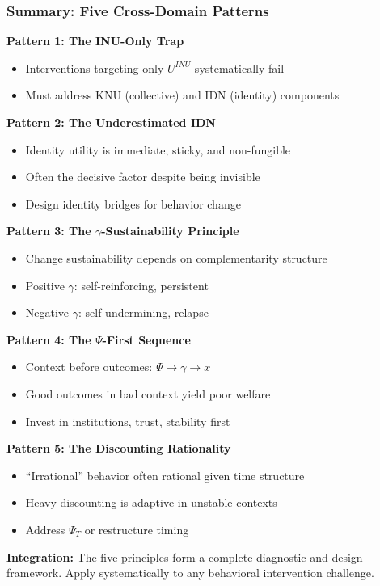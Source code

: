 \subsubsection{Summary: Five Cross-Domain Patterns}

\begin{tcolorbox}[colback=gray!5!white, colframe=gray!75!black, title=Section 10.10 Summary: Five Principles for Behavioral Intervention]

\textbf{Pattern 1: The INU-Only Trap}
\begin{itemize}
\item Interventions targeting only $U^{INU}$ systematically fail
\item Must address KNU (collective) and IDN (identity) components
\end{itemize}

\textbf{Pattern 2: The Underestimated IDN}
\begin{itemize}
\item Identity utility is immediate, sticky, and non-fungible
\item Often the decisive factor despite being invisible
\item Design identity bridges for behavior change
\end{itemize}

\textbf{Pattern 3: The $\gamma$-Sustainability Principle}
\begin{itemize}
\item Change sustainability depends on complementarity structure
\item Positive $\gamma$: self-reinforcing, persistent
\item Negative $\gamma$: self-undermining, relapse
\end{itemize}

\textbf{Pattern 4: The $\Psi$-First Sequence}
\begin{itemize}
\item Context before outcomes: $\Psi \rightarrow \gamma \rightarrow x$
\item Good outcomes in bad context yield poor welfare
\item Invest in institutions, trust, stability first
\end{itemize}

\textbf{Pattern 5: The Discounting Rationality}
\begin{itemize}
\item ``Irrational'' behavior often rational given time structure
\item Heavy discounting is adaptive in unstable contexts
\item Address $\Psi_T$ or restructure timing
\end{itemize}

\textbf{Integration:}
The five principles form a complete diagnostic and design framework.
Apply systematically to any behavioral intervention challenge.

\end{tcolorbox}

